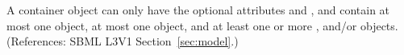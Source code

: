 A \ListOfRules container object can only have the optional attributes
 and , and contain at most one \Notes object,
at most one \Annotation object, and at least one or more \AssignmentRule,
\RateRule and/or \AlgebraicRule objects.  (References: SBML L3V1
Section~\ref{sec:model}.)
